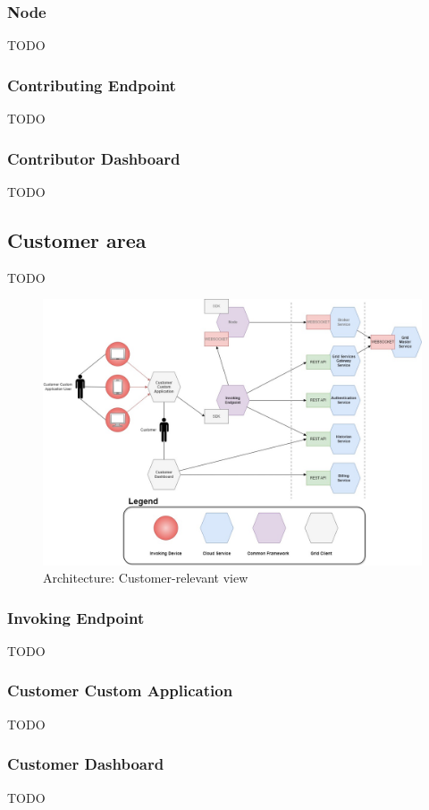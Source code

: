 \subsubsection{Node}
TODO

\subsubsection{Contributing Endpoint}
TODO

\subsubsection{Contributor Dashboard}
TODO

\subsection{Customer area}\label{customer_area}
TODO
\begin{figure}[!ht]
    \centering
    \includegraphics[width=\linewidth]{document/chapters/chapter_6/images/architecture_customer.jpg}
    \caption{Architecture: Customer-relevant view}
    \label{fig:architecture_customer}
\end{figure}

\subsubsection{Invoking Endpoint}
TODO

\subsubsection{Customer Custom Application}
TODO

\subsubsection{Customer Dashboard}
TODO

